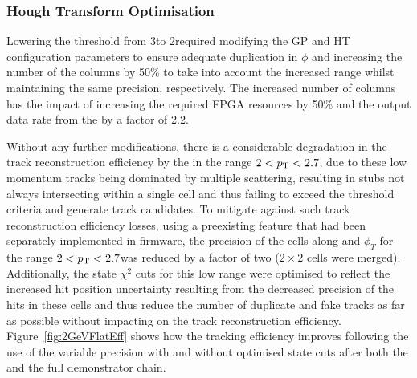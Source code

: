 \subsubsection{Hough Transform Optimisation}\label{subsubsec:lowPtOptHT}
Lowering the \HT \pT threshold from 3\GeV to 2\GeV required modifying the GP and HT configuration parameters to ensure adequate duplication in $\phi$ and increasing the number of the \qpt columns by 50\% to take into account the increased \pt range whilst maintaining the same precision, respectively.
The increased number of \qpt columns has the impact of increasing the required FPGA resources by 50\% and the output data rate from the \HT by a factor of 2.2.

Without any further modifications, there is a considerable degradation in the track reconstruction efficiency by the \HT in the range $2 < p_{\mathrm{T}} < 2.7$\GeVc, due to these low momentum tracks being dominated by multiple scattering, resulting in stubs not always intersecting within a single \HT cell and thus failing to exceed the threshold criteria and generate track candidates.
To mitigate against such track reconstruction efficiency losses, using a preexisting feature that had been separately implemented in firmware, the precision of the \HT cells along \qpt and $\phi_{T}$ for the range $2 < p_{\mathrm{T}} < 2.7$\GeVc was reduced by a factor of two (\ie $2 \times 2$ cells were merged).
Additionally, the \KF state $\chi^2$ cuts for this low \pT range were optimised to reflect the increased hit position uncertainty resulting from the decreased precision of the hits in these \HT cells and thus reduce the number of duplicate and fake tracks as far as possible without impacting on the \HT track reconstruction efficiency.
Figure~\ref{fig:2GeVFlatEff} shows how the tracking efficiency improves following the use of the variable precision \HT with and without optimised \KF state cuts after both the \HT and the full demonstrator chain. 

